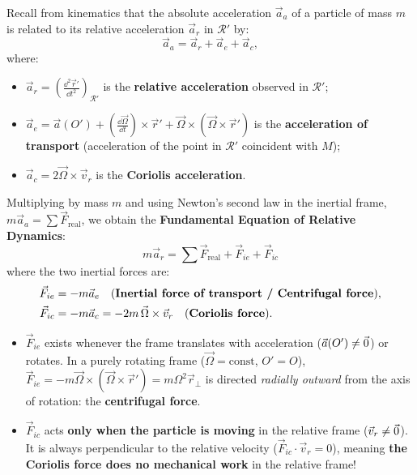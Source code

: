 Recall from kinematics that the absolute acceleration $\vec{a}_a$ of a particle of mass $m$ is related to its relative acceleration $\vec{a}_r$ in $\mathcal{R}'$ by:
\[
\vec{a}_a = \vec{a}_r + \vec{a}_e + \vec{a}_c,
\]
where:
\begin{itemize}[leftmargin=1.4em,itemsep=3pt]
  \item $\vec{a}_r = \left(\frac{\dd^2\vec{r}'}{\dd t^2}\right)_{\mathcal{R}'}$ is the \textbf{relative acceleration} observed in $\mathcal{R}'$;
  \item $\vec{a}_e = \vec{a}(O') + \left(\frac{\dd\vec{\Omega}}{\dd t}\right)\times\vec{r}' + \vec{\Omega}\times(\vec{\Omega}\times\vec{r}')$ is the \textbf{acceleration of transport} (acceleration of the point in $\mathcal{R}'$ coincident with $M$);
  \item $\vec{a}_c = 2\vec{\Omega}\times\vec{v}_r$ is the \textbf{Coriolis acceleration}.
\end{itemize}

Multiplying by mass $m$ and using Newton's second law in the inertial frame, $m\vec{a}_a = \sum\vec{F}_{\text{real}}$, we obtain the \textbf{Fundamental Equation of Relative Dynamics}:
\[
\boxed{m\vec{a}_r = \sum\vec{F}_{\text{real}} + \vec{F}_{ie} + \vec{F}_{ic}}
\]
where the two inertial forces are:
\begin{align}
\vec{F}_{ie} &= -m\vec{a}_e \quad \text{(\textbf{Inertial force of transport / Centrifugal force})}, \\
\vec{F}_{ic} &= -m\vec{a}_c = -2m\,\vec{\Omega}\times\vec{v}_r \quad \text{(\textbf{Coriolis force})}.
\end{align}

\begin{keyidea}
\begin{itemize}[leftmargin=1.4em,itemsep=2pt]
  \item $\vec{F}_{ie}$ exists whenever the frame translates with acceleration ($\vec{a}(O')\ne\vec{0}$) or rotates. In a purely rotating frame ($\vec{\Omega} = \text{const}$, $O'=O$), $\vec{F}_{ie} = -m\vec{\Omega}\times(\vec{\Omega}\times\vec{r}') = m\Omega^2\vec{r}_\perp$ is directed \emph{radially outward} from the axis of rotation: the \textbf{centrifugal force}.
  \item $\vec{F}_{ic}$ acts \textbf{only when the particle is moving} in the relative frame ($\vec{v}_r\ne\vec{0}$). It is always perpendicular to the relative velocity ($\vec{F}_{ic}\cdot\vec{v}_r = 0$), meaning \textbf{the Coriolis force does no mechanical work} in the relative frame!
\end{itemize}
\end{keyidea}


